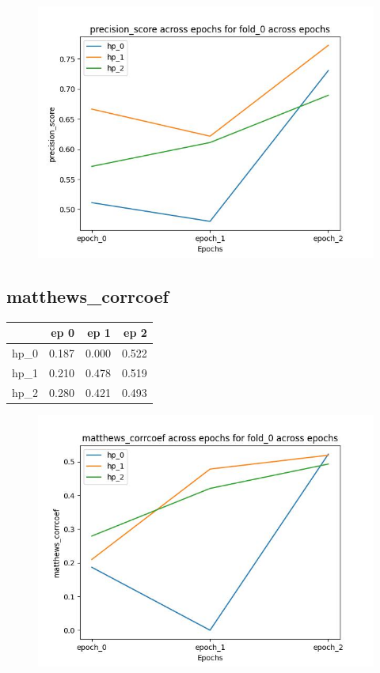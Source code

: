 \documentclass{article}
\begin{document}
\begin{figure}[H]
\includegraphics[scale = 0.75]{fold_0/precision_score}
\end{figure}
\subsection{matthews\_corrcoef}
\begin{tabular}{lrrr}
\toprule
{} &   ep 0 &   ep 1 &   ep 2 \\
\midrule
hp\_0 &  0.187 &  0.000 &  0.522 \\
hp\_1 &  0.210 &  0.478 &  0.519 \\
hp\_2 &  0.280 &  0.421 &  0.493 \\
\bottomrule
\end{tabular}

\begin{figure}[H]
\includegraphics[scale = 0.75]{fold_0/matthews_corrcoef}
\end{figure}
\end{document}
